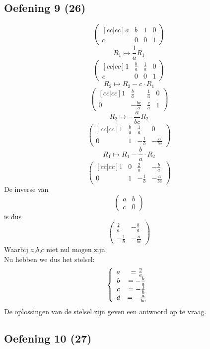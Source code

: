 \documentclass[lineaire_algebra_oplossingen.tex]{subfiles}
\begin{document}
\subsection{Oefening 9 (26)}

\[
\begin{pmatrix}[cc|cc]
a & b & 1 & 0\\
c & 0 & 0 & 1
\end{pmatrix}
\]
\[ R_1 \longmapsto \frac{1}{a} R_1 \]
\[
\begin{pmatrix}[cc|cc]
1 & \frac{b}{a} & \frac{1}{a} & 0\\
c & 0 & 0 & 1
\end{pmatrix}
\]
\[ R_2 \longmapsto R_2 - c \cdot R_1\]
\[
\begin{pmatrix}[cc|cc]
1 & \frac{b}{a} & \frac{1}{a} & 0\\
0 & -\frac{bc}{a} & \frac{c}{a} & 1
\end{pmatrix}
\]
\[ R_2 \longmapsto -\frac{a}{bc} R_2 \]
\[
\begin{pmatrix}[cc|cc]
1 & \frac{b}{a} & \frac{1}{a} & 0\\
0 & 1 & -\frac{1}{b} & -\frac{a}{bc}
\end{pmatrix}
\]
\[ R_1 \longmapsto R_1 - \frac{b}{a} \cdot R_2\]
\[
\begin{pmatrix}[cc|cc]
1 & 0 & \frac{2}{a} & -\frac{b}{a}\\
0 & 1 & -\frac{1}{b} & -\frac{a}{bc}
\end{pmatrix}
\]
De inverse van 
\[
\begin{pmatrix}
a & b\\
c & 0
\end{pmatrix}
\]
is dus
\[
\begin{pmatrix}
\frac{2}{a} & -\frac{b}{a}\\
-\frac{1}{b} & -\frac{a}{bc}
\end{pmatrix}
\]
Waarbij $a$,$b$,$c$ niet nul mogen zijn.\\
Nu hebben we dus het stelsel:
\[
\left\lbrace
\begin{array}{c c}
a &= \frac{2}{a}\\
b &= -\frac{b}{a}\\
c &= -\frac{1}{b}\\
d &= -\frac{a}{bc}
\end{array}
\right.
\]
De oplossingen van de stelsel zijn geven een antwoord op te vraag.

\subsection{Oefening 10 (27)}
\end{document}
